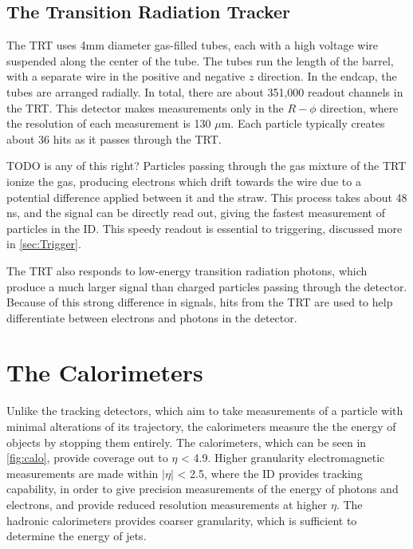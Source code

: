 \subsection{The Transition Radiation Tracker}

The \ac{TRT} uses 4mm diameter gas-filled tubes, each with a high voltage wire suspended along the center of the tube. The tubes run the length of the barrel, with a separate wire in the positive and negative $z$ direction. In the endcap, the tubes are arranged radially. In total, there are about 351,000 readout channels in the \ac{TRT}. This detector makes measurements only in the $R-\phi$ direction, where the resolution of each measurement is 130 $\mu$m. Each particle typically creates about 36 hits as it passes through the \ac{TRT}. 

TODO is any of this right?
Particles passing through the gas mixture of the \ac{TRT} ionize the gas, producing electrons which drift towards the wire due to a potential difference applied between it and the straw. This process takes about 48 ns, and the signal can be directly read out, giving the fastest measurement of particles in the \ac{ID}. This speedy readout is essential to triggering, discussed more in \autoref{sec:Trigger}. 

The \ac{TRT} also responds to low-energy transition radiation photons, which produce a much larger signal than charged particles passing through the detector. Because of this strong difference in signals, hits from the \ac{TRT} are used to help differentiate between electrons and photons in the detector.

\section{The Calorimeters}
\label{sec:Calo}

Unlike the tracking detectors, which aim to take measurements of a particle with minimal alterations of its trajectory, the calorimeters measure the the energy of objects by stopping them entirely. The calorimeters, which can be seen in \autoref{fig:calo}, provide coverage out to $\eta$ < 4.9. Higher granularity electromagnetic measurements are made within $|\eta|$ < 2.5, where the \ac{ID} provides tracking capability, in order to give precision measurements of the energy of photons and electrons, and provide reduced resolution measurements at higher $\eta$. The hadronic calorimeters provides coarser granularity, which is sufficient to determine the energy of jets. 

